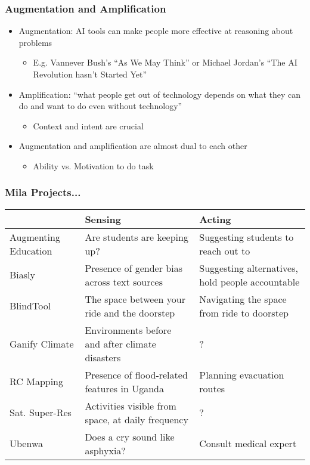 \documentclass[10pt,mathserif]{beamer}
\begin{document}
\begin{frame}
  \frametitle{Augmentation and Amplification}
  \begin{itemize}
  \item Augmentation: AI tools can make people more effective at reasoning about
    problems
    \begin{itemize}
    \item E.g. Vannever Bush's ``As We May Think'' or Michael Jordan's ``The AI
      Revolution hasn't Started Yet''
    \end{itemize}
  \item Amplification: ``what people get out of technology depends on what they
    can do and want to do even without technology''
    \begin{itemize}
    \item Context and intent are crucial
    \end{itemize}
  \item Augmentation and amplification are almost dual to each other
    \begin{itemize}
    \item Ability vs. Motivation to do task
    \end{itemize}
  \end{itemize}
\end{frame}

\begin{frame}
  \frametitle{Mila Projects...}
 \begin{table}[]
   \begin{tabular}{|p{2cm}|p{4cm}|p{4cm}|}
     \hline
     & \textbf{Sensing}                                            & \textbf{Acting}                                                                      \\ \hline
     Augmenting Education       & Are students are keeping up? & Suggesting students to reach out to                                  \\
     Biasly                     & Presence of gender bias across text sources       & Suggesting alternatives, hold people accountable \\ \hline
     BlindTool                  & The space between your ride and the doorstep      & Navigating the space from ride to doorstep             \\ \hline
     Ganify Climate & Environments before and after climate disasters   & ?                           \\ \hline
     RC Mapping          & Presence of flood-related features in Uganda      & Planning evacuation routes \\  \hline
     Sat. Super-Res & Activities visible from space, at daily frequency & ?                                                                  \\ \hline
     Ubenwa & Does a cry sound like asphyxia? & Consult medical expert \\\hline
   \end{tabular}
 \end{table}
\end{frame}
\end{document}
